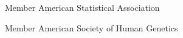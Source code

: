 

%

\begin{cvhonors}

  \cvhonor
    {Member} %
    {American Statistical Association} %
    {} %
    {} %

  \cvhonor
    {Member} %
    {American Society of Human Genetics} %
    {} %
    {} %

\end{cvhonors}
